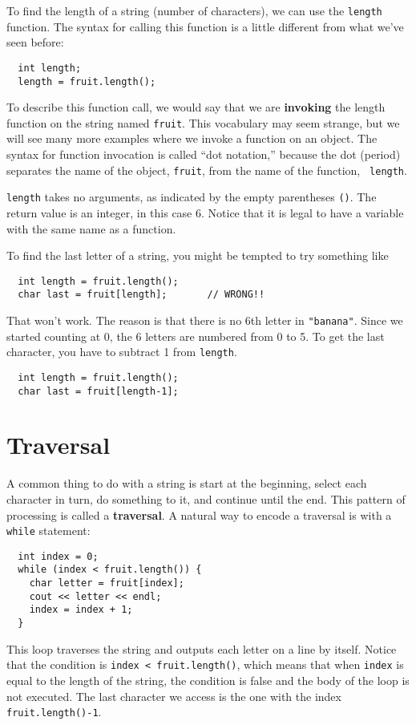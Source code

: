 To find the length of a string (number of characters), we can
use the {\tt length} function.  The syntax for calling this
function is a little different from what we've seen before:

\begin{verbatim}
  int length;
  length = fruit.length();
\end{verbatim}
%
To describe this function call, we would say that we are {\bf
invoking} the length function on the string named {\tt fruit}.  This
vocabulary may seem strange, but we will see many more examples where
we invoke a function on an object.  The syntax for function invocation
is called ``dot notation,'' because the dot (period) separates the
name of the object, {\tt fruit}, from the name of the function, {\tt
length}.

{\tt length} takes no arguments, as indicated by the empty parentheses
{\tt ()}.  The return value is an integer, in this case 6.  Notice
that it is legal to have a variable with the same name as a function.

To find the last letter of a string, you might be tempted to
try something like

\begin{verbatim}
  int length = fruit.length();
  char last = fruit[length];       // WRONG!!
\end{verbatim}
%
That won't work.  The reason is that there is no 6th letter
in {\tt "banana"}.  Since we started counting at 0, the 6
letters are numbered from 0 to 5.  To get the last character,
you have to subtract 1 from {\tt length}.

\begin{verbatim}
  int length = fruit.length();
  char last = fruit[length-1];
\end{verbatim}

\section{Traversal}

A common thing to do with a string is
start at the beginning, select each character in turn, do
something to it, and continue until the end.  This pattern
of processing is called a {\bf traversal}.  A natural
way to encode a traversal is with a {\tt while} statement:

\begin{verbatim}
  int index = 0;
  while (index < fruit.length()) {
    char letter = fruit[index];
    cout << letter << endl;
    index = index + 1;
  }
\end{verbatim}
%
This loop traverses the string and outputs each letter on
a line by itself.  Notice that the condition is
{\tt index < fruit.length()}, which means that when
{\tt index} is equal to the length of the string, the
condition is false and the body of the loop is not executed.
The last character we access is the one with the
index {\tt fruit.length()-1}.

